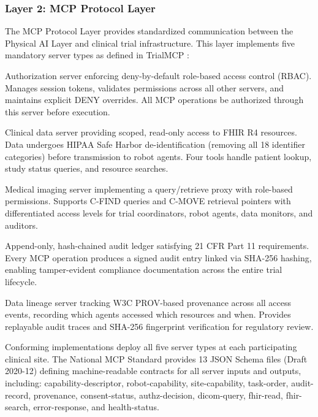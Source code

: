 \documentclass[11pt,letterpaper]{article}
\begin{document}
\subsubsection{Layer 2: MCP Protocol Layer}

The MCP Protocol Layer provides standardized communication between the Physical AI Layer and clinical trial infrastructure. This layer implements five mandatory server types as defined in TrialMCP \cite{kawchak2026mcp}:

\begin{description}[leftmargin=3.5cm, style=sameline]
  \item[trialmcp-authz] Authorization server enforcing deny-by-default role-based access control (RBAC). Manages session tokens, validates permissions across all other servers, and maintains explicit DENY overrides. All MCP operations \SHALL{} be authorized through this server before execution.

  \item[trialmcp-fhir] Clinical data server providing scoped, read-only access to FHIR R4 resources. Data undergoes HIPAA Safe Harbor de-identification (removing all 18 identifier categories) before transmission to robot agents. Four tools handle patient lookup, study status queries, and resource searches.

  \item[trialmcp-dicom] Medical imaging server implementing a query/retrieve proxy with role-based permissions. Supports C-FIND queries and C-MOVE retrieval pointers with differentiated access levels for trial coordinators, robot agents, data monitors, and auditors.

  \item[trialmcp-ledger] Append-only, hash-chained audit ledger satisfying 21 CFR Part 11 requirements. Every MCP operation produces a signed audit entry linked via SHA-256 hashing, enabling tamper-evident compliance documentation across the entire trial lifecycle.

  \item[trialmcp-provenance] Data lineage server tracking W3C PROV-based provenance across all access events, recording which agents accessed which resources and when. Provides replayable audit traces and SHA-256 fingerprint verification for regulatory review.
\end{description}

Conforming implementations \SHALL{} deploy all five server types at each participating clinical site. The National MCP Standard \cite{kawchak2026nationalmcp} provides 13 JSON Schema files (Draft 2020-12) defining machine-readable contracts for all server inputs and outputs, including: capability-descriptor, robot-capability, site-capability, task-order, audit-record, provenance, consent-status, authz-decision, dicom-query, fhir-read, fhir-search, error-response, and health-status.
\end{document}
